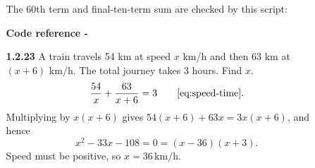 \begin{enumerate}[label={},leftmargin=0pt]
\begin{enumerate}[label={},leftmargin=0pt,itemsep=9pt]
The 60th term and final-ten-term sum are checked by this script:
\par\smallskip
\noindent\textbf{Code reference -}
\par\noindent{}
\par\smallskip
\setcounter{enumii}{23}
\setcounter{equation}{0}
\item[\textbf{1.2.23}] A train travels 54 km at speed $x$ km/h and then 63 km at $(x+6)$ km/h. The total journey takes 3 hours. Find $x$.
\solution
\begin{equation}
\frac{54}{x}+\frac{63}{x+6}=3\qquad\eqref{eq:speed-time}.
\end{equation}
Multiplying by $x(x+6)$ gives $54(x+6)+63x=3x(x+6)$, and hence
\begin{equation}
x^2-33x-108=0=(x-36)(x+3).
\end{equation}
Speed must be positive, so $x=36\,\mathrm{km/h}$.





\end{enumerate}
\end{enumerate}
